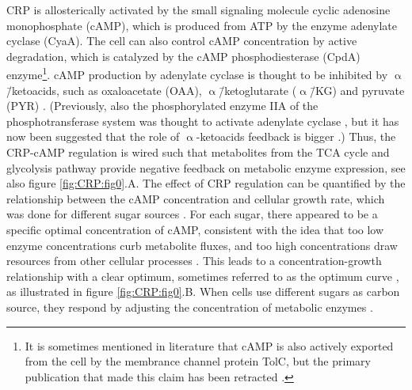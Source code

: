 CRP is allosterically activated by the small signaling molecule cyclic adenosine monophosphate (cAMP), 
which is 
produced from ATP by the enzyme adenylate cyclase (CyaA).
%
The cell can also control cAMP concentration by active degradation, 
which is catalyzed by the 
cAMP phosphodiesterase (CpdA) enzyme\footnote{It is sometimes mentioned in literature that cAMP is also actively exported from the cell by the membrance channel protein TolC, but the primary publication that made this claim has been retracted \cite{Hantke2011}.}.
%
cAMP production by adenylate cyclase is thought to be inhibited by $\upalpha$\=/ketoacids, such as oxaloacetate (OAA), $\upalpha$\=/ketoglutarate ($\upalpha$\=/KG) and pyruvate (PYR) \cite{You2013}.
(Previously, also the phosphorylated enzyme IIA of the phosphotransferase system was thought to activate adenylate cyclase \cite{Keseler2017, Deutscher2008, Gorke2008}, but it has now been suggested that the role of $\upalpha$-ketoacids feedback is bigger \cite{You2013}.)
%
Thus, the CRP-cAMP regulation is wired such that metabolites from the TCA cycle and glycolysis pathway provide negative feedback on metabolic enzyme expression, see also figure \ref{fig:CRP:fig0}.A. 
%
The effect of CRP regulation can be quantified by the relationship between the cAMP concentration and cellular growth rate, 
which was done for different sugar sources \cite{Towbin2017}.
%
For each sugar, there appeared to be a specific optimal concentration of cAMP, consistent with the idea that
%
too low enzyme concentrations curb metabolite fluxes, and too high concentrations draw resources from other cellular processes 
\cite{Jensen1993, Dekel2005, Berkhout2013, Ray2016, Towbin2017, You2013}.
%
This leads to a concentration-growth relationship with a clear optimum, sometimes referred to as the optimum curve \cite{Towbin2017}, as illustrated in figure \ref{fig:CRP:fig0}.B.
%
%
When cells use different sugars as carbon source, they respond by adjusting the concentration of metabolic enzymes \cite{You2013}.
